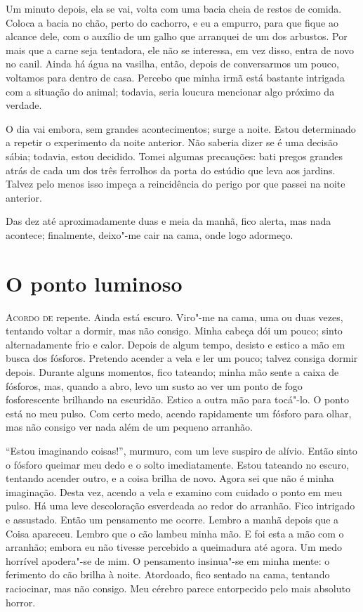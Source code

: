 Um minuto depois, ela se vai, volta com uma bacia cheia de restos de comida. Coloca a bacia no chão, perto do cachorro,
e eu a empurro, para que fique ao alcance dele, com o auxílio de um galho que arranquei de um dos arbustos. Por mais
que a carne seja tentadora, ele não se interessa, em vez disso, entra de novo no canil. Ainda há água na vasilha,
então, depois de conversarmos um pouco, voltamos para dentro de casa. Percebo que minha irmã está bastante intrigada
com a situação do animal; todavia, seria loucura mencionar algo próximo da verdade.

O dia vai embora, sem grandes acontecimentos; surge a noite. Estou determinado a repetir o experimento da noite
anterior. Não saberia dizer se é uma decisão sábia; todavia, estou decidido. Tomei algumas precauções: bati
pregos grandes atrás de cada um dos três ferrolhos da porta do estúdio que leva aos jardins. Talvez pelo menos isso
impeça a reincidência do perigo por que passei na noite anterior.

Das dez até aproximadamente duas e meia da manhã, fico alerta, mas nada acontece; finalmente, deixo"-me cair na cama,
onde logo adormeço.


\clearpage

\chapter{O ponto luminoso}

\textsc{Acordo de} repente. Ainda está escuro. Viro"-me na cama, uma ou duas vezes, tentando voltar a dormir, mas não consigo.
Minha cabeça dói um pouco; sinto alternadamente frio e calor. Depois de algum tempo, desisto e estico a mão em busca
dos fósforos. Pretendo acender a vela e ler um pouco; talvez consiga dormir depois. Durante alguns momentos, fico
tateando; minha mão sente a caixa de fósforos, mas, quando a abro, levo um susto ao ver um ponto de fogo fosforescente
brilhando na escuridão. Estico a outra mão para tocá"-lo. O ponto está no meu pulso. Com certo medo, acendo rapidamente
um fósforo para olhar, mas não consigo ver nada além de um pequeno arranhão.

``Estou imaginando coisas!'', murmuro, com um leve suspiro de alívio. Então sinto o fósforo queimar meu dedo e o solto
imediatamente. Estou tateando no escuro, tentando acender outro, e a coisa brilha de novo. Agora sei que não é minha
imaginação. Desta vez, acendo a vela e examino com cuidado o ponto em meu pulso. Há uma leve descoloração esverdeada
ao redor do arranhão. Fico intrigado e assustado. Então um pensamento me ocorre. Lembro a manhã depois que a Coisa
apareceu. Lembro que o cão lambeu minha mão. E foi esta a mão com o arranhão; embora eu não tivesse percebido a
queimadura até agora. Um medo horrível apodera"-se de mim. O pensamento insinua"-se em minha mente: o ferimento do cão
brilha à noite. Atordoado, fico sentado na cama, tentando raciocinar, mas não consigo. Meu cérebro parece entorpecido
pelo mais absoluto horror. 

